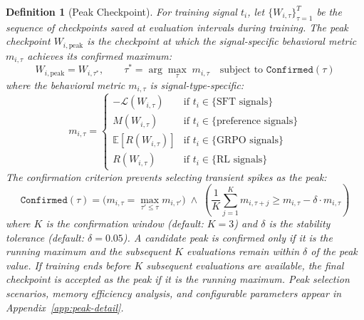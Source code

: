 \documentclass[11pt]{article}
\newtheorem{definition}{Definition}[section]
\begin{document}
\begin{definition}[Peak Checkpoint]
\label{def:peak-checkpoint}
For training signal $t_i$, let $\{W_{i,\tau}\}_{\tau=1}^{T}$ be the sequence of checkpoints saved at evaluation intervals during training. The peak checkpoint $W_{i,\text{peak}}$ is the checkpoint at which the signal-specific behavioral metric $m_{i,\tau}$ achieves its confirmed maximum:
\begin{equation}
W_{i,\text{peak}} = W_{i,\tau^*}, \qquad \tau^* = \arg\max_\tau\; m_{i,\tau} \quad \text{subject to } \texttt{Confirmed}(\tau)
\end{equation}
where the behavioral metric $m_{i,\tau}$ is signal-type-specific:
\begin{equation}
m_{i,\tau} = \begin{cases}
-\mathcal{L}(W_{i,\tau}) & \text{if } t_i \in \{\text{SFT signals}\} \\
M(W_{i,\tau}) & \text{if } t_i \in \{\text{preference signals}\} \\
\mathbb{E}[R(W_{i,\tau})] & \text{if } t_i \in \{\text{GRPO signals}\} \\
R(W_{i,\tau}) & \text{if } t_i \in \{\text{RL signals}\}
\end{cases}
\end{equation}
The confirmation criterion prevents selecting transient spikes as the peak:
\begin{equation}
\texttt{Confirmed}(\tau) = \bigl(m_{i,\tau} = \max_{\tau' \leq \tau} m_{i,\tau'}\bigr) \;\wedge\; \left(\frac{1}{K}\sum_{j=1}^{K} m_{i,\tau+j} \geq m_{i,\tau} - \delta \cdot m_{i,\tau}\right)
\end{equation}
where $K$ is the confirmation window (default: $K=3$) and $\delta$ is the stability tolerance (default: $\delta = 0.05$). A candidate peak is confirmed only if it is the running maximum \emph{and} the subsequent $K$ evaluations remain within $\delta$ of the peak value. If training ends before $K$ subsequent evaluations are available, the final checkpoint is accepted as the peak if it is the running maximum. Peak selection scenarios, memory efficiency analysis, and configurable parameters appear in Appendix~\ref{app:peak-detail}.
\end{definition}
\end{document}
